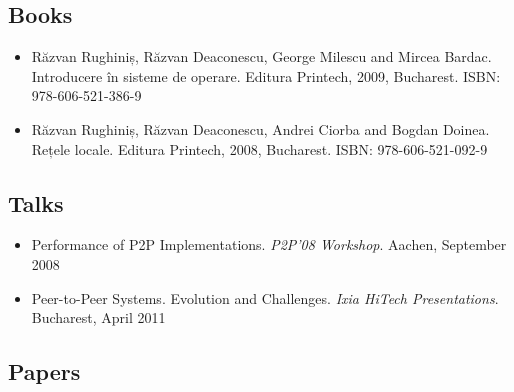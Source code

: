 \subsection{Books}

\begin{itemize}
  \item Răzvan Rughiniș, Răzvan Deaconescu, George Milescu and Mircea Bardac.
  Introducere în sisteme de operare. Editura Printech, 2009, Bucharest. ISBN:
  978-606-521-386-9
  \item Răzvan Rughiniș, Răzvan Deaconescu, Andrei Ciorba and Bogdan Doinea.
  Rețele locale. Editura Printech, 2008, Bucharest. ISBN: 978-606-521-092-9
\end{itemize}

\subsection{Talks}

\begin{itemize}
  \item Performance of P2P Implementations. \textit{P2P'08 Workshop}. Aachen,
  September 2008
  \item Peer-to-Peer Systems. Evolution and Challenges. \textit{Ixia HiTech
  Presentations}. Bucharest, April 2011
\end{itemize}

\subsection{Papers}

